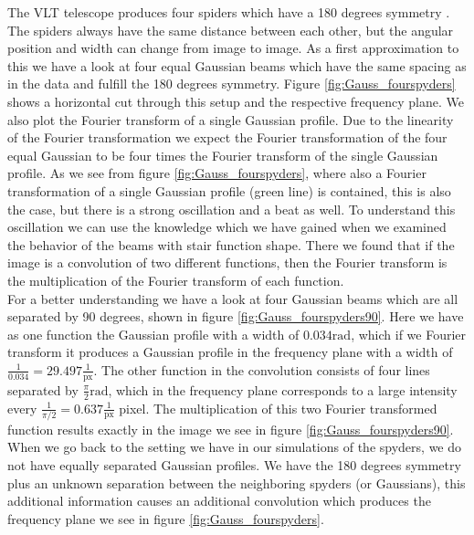 The VLT telescope produces four spiders which have a 180 degrees symmetry \cite{ESOmanual}. The spiders always have the same distance between each other, but the angular position and width can change from image to image. As a first approximation to this we have a look at four equal Gaussian beams which have the same spacing as in the data and fulfill the 180 degrees symmetry. Figure \ref{fig:Gauss_fourspyders} shows a horizontal cut through this setup and the respective frequency plane. We also plot the Fourier transform of a single Gaussian profile. Due to the linearity of the Fourier transformation we expect the Fourier transformation of the four equal Gaussian to be four times the Fourier transform of the single Gaussian profile. As we see from figure \ref{fig:Gauss_fourspyders}, where also a Fourier transformation of a single Gaussian profile (green line) is contained, this is also the case, but there is a strong oscillation and a beat as well. To understand this oscillation we can use the knowledge which we have gained when we examined the behavior of the beams with stair function shape. There we found that if the image is a convolution of two different functions, then the Fourier transform is the multiplication of the Fourier transform of each function. \\
For a better understanding we have a look at four Gaussian beams which are all separated by 90 degrees, shown in figure \ref{fig:Gauss_fourspyders90}. Here we have as one function the Gaussian profile with a width of $0.034 \mathrm{rad}$,  which if we Fourier transform it produces a Gaussian profile in the frequency plane with a width of $\frac{1}{0.034} = 29.497 \frac{1}{\mathrm{px}}$. The other function in the convolution consists of four lines separated by $\frac{\pi}{2} \mathrm{rad}$, which in the frequency plane corresponds to a large intensity every $\frac{1}{\pi/2} = 0.637 \frac{1}{\mathrm{px}}$ pixel. The multiplication of this two Fourier transformed function results exactly in the image we see in figure \ref{fig:Gauss_fourspyders90}. \\
When we go back to the setting we have in our simulations of the spyders, we do not have equally separated Gaussian profiles. We have the 180 degrees symmetry plus an unknown separation between the neighboring spyders (or Gaussians), this additional information causes an additional convolution which produces the frequency plane we see in figure \ref{fig:Gauss_fourspyders}. 
